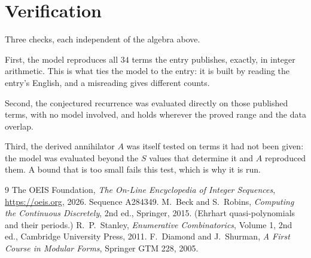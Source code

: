 \documentclass[11pt,a4paper]{article}
\theoremstyle{plain}
\theoremstyle{definition}
\begin{document}
\section{Verification}

Three checks, each independent of the algebra above.

First, the model reproduces all $34$ terms the entry publishes, exactly, in integer
arithmetic. This is what ties the model to the entry: it is built by reading the entry's
English, and a misreading gives different counts.

Second, the conjectured recurrence was evaluated directly on those published terms, with no
model involved, and holds wherever the proved range and the data overlap.

Third, the derived annihilator $A$ was itself tested on terms it had not been given: the model
was evaluated beyond the $S$ values that determine it and $A$ reproduced them. A bound that is
too small fails this test, which is why it is run.

\begin{thebibliography}{9}
 The OEIS Foundation, \emph{The On-Line Encyclopedia of Integer
Sequences}, \url{https://oeis.org}, 2026. Sequence A284349.
 M.~Beck and S.~Robins, \emph{Computing the Continuous Discretely},
2nd ed., Springer, 2015. (Ehrhart quasi-polynomials and their periods.)
 R.~P.~Stanley, \emph{Enumerative Combinatorics}, Volume 1, 2nd ed.,
Cambridge University Press, 2011.
 F.~Diamond and J.~Shurman, \emph{A First Course in Modular Forms},
Springer GTM 228, 2005.
\end{thebibliography}
\end{document}

